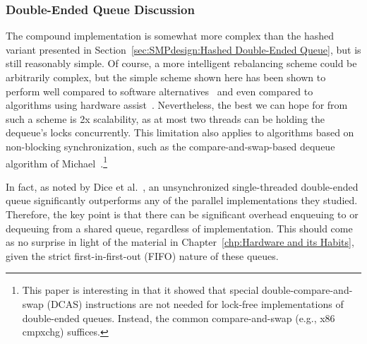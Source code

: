 \subsubsection{Double-Ended Queue Discussion}
\label{sec:SMPdesign:Double-Ended Queue Discussion}

The compound implementation is somewhat more complex than the
hashed variant presented in
Section~\ref{sec:SMPdesign:Hashed Double-Ended Queue},
but is still reasonably simple.
Of course, a more intelligent rebalancing scheme could be arbitrarily
complex, but the simple scheme shown here has been shown to
perform well compared to software
alternatives~\cite{LukeDalessandro:2011:ASPLOS:HybridNOrecSTM:deque}
and even compared to algorithms using hardware
assist~\cite{DavidDice:2010:SCA:HTM:deque}.
Nevertheless, the best we can hope for from such a scheme
is 2x scalability, as at most two threads can be holding the
dequeue's locks concurrently.
This limitation also applies to algorithms based on non-blocking
synchronization, such as the compare-and-swap-based dequeue algorithm of
Michael~\cite{DBLP:conf/europar/Michael03}.\footnote{
	This paper is interesting in that it showed that special
	double-compare-and-swap (DCAS) instructions are not needed
	for lock-free implementations of double-ended queues.
	Instead, the common compare-and-swap (e.g., x86 cmpxchg)
	suffices.}

\QuickQuizEnd

In fact, as noted by Dice et al.~\cite{DavidDice:2010:SCA:HTM:deque},
an unsynchronized single-threaded double-ended queue significantly
outperforms any of the parallel implementations they studied.
Therefore, the key point is that there can be significant overhead enqueuing to
or dequeuing from a shared queue, regardless of implementation.
This should come as no surprise in light of the material in
Chapter~\ref{chp:Hardware and its Habits}, given the strict
first-in-first-out (FIFO) nature of these queues.

